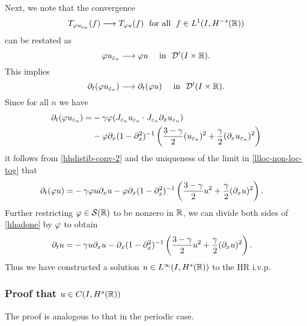 %
Next, we note that the convergence  
%
\begin{equation}
\label{hhweak-conv-2}
T_{\varphi u_{\varepsilon_n}}(f)  \longrightarrow  T_{\varphi u} (f) \;
\ \text{for all} \  \;  f \in L^1(I, H^{-s}(\mathbb{R}))
\end{equation}
%
can be restated as 
%
\begin{equation}
\varphi u_{\varepsilon_n}  \longrightarrow  \varphi u
\quad
\ \text{in} \  \,\,
\mathcal{D}'(I\times \mathbb{R}).
\end{equation}
%
This implies 
%
\begin{equation}
\label{hhdistib-conv-2}
\partial_t(\varphi u_{\varepsilon_n})  \longrightarrow  \partial_t (\varphi u)
\quad
\ \text{in} \   \,\, \mathcal{D}'(I\times \mathbb{R}).
\end{equation}
%
Since for all $n$ we have 
%
\begin{equation}
\begin{split}
\partial_t (\varphi u_{\varepsilon_n})
= & -\gamma \varphi
(J_{\varepsilon_n} u_{\varepsilon_n}  \cdot
J_{\varepsilon_n}\partial_x u_{\varepsilon_n})
\\
& -
\varphi \partial_x(1- \partial_x^2)^{-1} \left( \frac{3-\gamma}{2} (u_{\varepsilon_n})^2
+ \frac{\gamma}{2} (\partial_x u_{\varepsilon_n})^2 \right )
\end{split}
\end{equation}
%
it follows from \eqref{hhdistib-conv-2} and the uniqueness of the
limit in \eqref{llloc-non-loc-tog} that
\begin{equation}
\begin{split}
\partial_t (\varphi u)
= & -\gamma \varphi
u \partial_x u - \varphi \partial_x(1- \partial_x^2)^{-1} \left( \frac{3-\gamma}{2} u^2
+ \frac{\gamma}{2} (\partial_x u)^2 \right ).
\label{hhadone}
\end{split}
\end{equation}
Further restricting $\varphi \in \mathcal{S}(\mathbb{R})$ to be nonzero in
$\mathbb{R}$, we
can divide both sides of \eqref{hhadone} by $\varphi$ to obtain
\begin{equation}
\label{hh2yy}
\begin{split}
\partial_t  u
= & -\gamma
u \partial_x u - \partial_x(1- \partial_x^2)^{-1} \left( \frac{3-\gamma}{2} u^2
+ \frac{\gamma}{2} (\partial_x u)^2 \right ).
\end{split}
\end{equation}
Thus we have constructed a solution $u \in L^\infty(I, H^s(\mathbb{R}))$
to the HR i.v.p. 

\subsubsection{Proof that $u \in C(I, H^s(\mathbb{R}))$} The proof is analogous to that in the periodic case.
